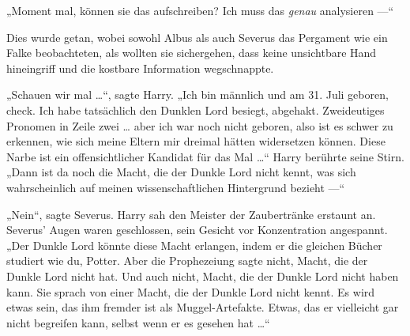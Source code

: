 „Moment mal, können sie das aufschreiben? Ich muss das \emph{genau} analysieren —“

Dies wurde getan, wobei sowohl Albus als auch Severus das Pergament wie ein Falke beobachteten, als wollten sie sichergehen, dass keine unsichtbare Hand hineingriff und die kostbare Information wegschnappte.

„Schauen wir mal …“, sagte Harry.
„Ich bin männlich und am 31. Juli geboren, check. Ich habe tatsächlich den Dunklen Lord besiegt, abgehakt. Zweideutiges Pronomen in Zeile zwei … aber ich war noch nicht geboren, also ist es schwer zu erkennen, wie sich meine Eltern mir dreimal hätten widersetzen können. Diese Narbe ist ein offensichtlicher Kandidat für das Mal …“ Harry berührte seine Stirn.
„Dann ist da noch die Macht, die der Dunkle Lord nicht kennt, was sich wahrscheinlich auf meinen wissenschaftlichen Hintergrund bezieht —“



„Nein“, sagte Severus. Harry sah den Meister der Zaubertränke erstaunt an. Severus’ Augen waren geschlossen, sein Gesicht vor Konzentration angespannt.
„Der Dunkle Lord könnte diese Macht erlangen, indem er die gleichen Bücher studiert wie du, Potter. Aber die Prophezeiung sagte nicht, Macht, die der Dunkle Lord nicht hat. Und auch nicht, Macht, die der Dunkle Lord nicht haben kann. Sie sprach von einer Macht, die der Dunkle Lord nicht kennt. Es wird etwas sein, das ihm fremder ist als Muggel-Artefakte. Etwas, das er vielleicht gar nicht begreifen kann, selbst wenn er es gesehen hat …“

